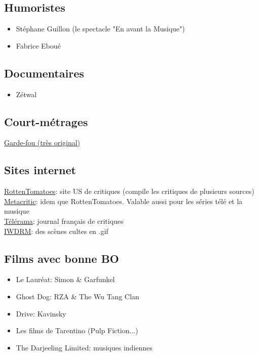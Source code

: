 \subsection{Humoristes}
\begin{itemize}
\item Stéphane Guillon (le spectacle "En avant la Musique")
\item Fabrice Eboué
\end{itemize}

\subsection{Documentaires}
\begin{itemize}
\item Zétwal
\end{itemize}

\subsection{Court-métrages}
\href{http://www.dailymotion.com/video/xchpac_garde-fou_shortfilms}{Garde-fou (très original)}

\subsection{Sites internet}
\href{https://www.rottentomatoes.com/}{RottenTomatoes}: site US de critiques (compile les critiques de plusieurs sources)\\
\href{http://www.metacritic.com/}{Metacritic}: idem que RottenTomatoes. Valable aussi pour les séries télé et la musique\\
\href{http://www.telerama.fr/}{Télérama}: journal français de critiques\\
\href{http://iwdrm.tumblr.com/}{IWDRM}: des scènes cultes en .gif\\

\subsection{Films avec bonne BO}
\begin{itemize}
\item Le Lauréat: Simon \& Garfunkel
\item Ghost Dog: RZA \& The Wu Tang Clan
\item Drive: Kavinsky
\item Les films de Tarentino (Pulp Fiction...)
\item The Darjeeling Limited: musiques indiennes
\end{itemize}

